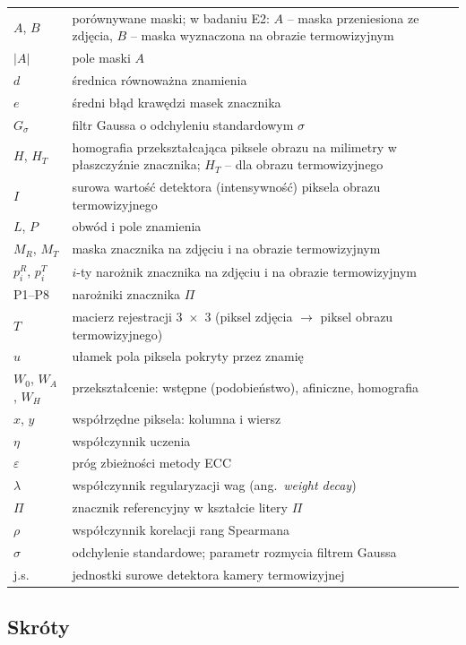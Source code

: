 {\small
\begin{longtable}{@{}p{2.6cm}p{12.2cm}@{}}
  $A$, $B$ & porównywane maski; w badaniu E2: $A$ -- maska przeniesiona ze zdjęcia, $B$ -- maska wyznaczona na obrazie termowizyjnym \\
  $|A|$ & pole maski $A$ \\
  $d$ & średnica równoważna znamienia \\
  $e$ & średni błąd krawędzi masek znacznika \\
  $G_\sigma$ & filtr Gaussa o odchyleniu standardowym $\sigma$ \\
  $H$, $H_T$ & homografia przekształcająca piksele obrazu na milimetry w płaszczyźnie znacznika; $H_T$ -- dla obrazu termowizyjnego \\
  $I$ & surowa wartość detektora (intensywność) piksela obrazu termowizyjnego \\
  $L$, $P$ & obwód i pole znamienia \\
  $M_R$, $M_T$ & maska znacznika na zdjęciu i na obrazie termowizyjnym \\
  $p_i^R$, $p_i^T$ & $i$-ty narożnik znacznika na zdjęciu i na obrazie termowizyjnym \\
  P1--P8 & narożniki znacznika $\Pi$ \\
  $T$ & macierz rejestracji 3~$\times$~3 (piksel zdjęcia $\to$ piksel obrazu termowizyjnego) \\
  $u$ & ułamek pola piksela pokryty przez znamię \\
  $W_0$, $W_A$, $W_H$ & przekształcenie: wstępne (podobieństwo), afiniczne, homografia \\
  $x$, $y$ & współrzędne piksela: kolumna i wiersz \\
  $\eta$ & współczynnik uczenia \\
  $\varepsilon$ & próg zbieżności metody ECC \\
  $\lambda$ & współczynnik regularyzacji wag (ang.~\textit{weight decay}) \\
  $\Pi$ & znacznik referencyjny w kształcie litery $\Pi$ \\
  $\rho$ & współczynnik korelacji rang Spearmana \\
  $\sigma$ & odchylenie standardowe; parametr rozmycia filtrem Gaussa \\
  j.s. & jednostki surowe detektora kamery termowizyjnej \\
\end{longtable}
}

\subsection*{Skróty}

